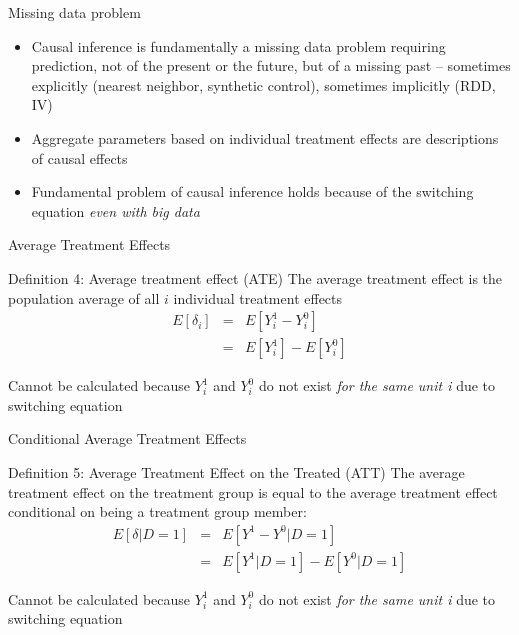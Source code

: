 \documentclass{beamer}
\begin{document}
\begin{frame}{Missing data problem}

  \begin{itemize}
    \item Causal inference is fundamentally a missing data problem requiring prediction, not of the present or the future, but of a missing past -- sometimes explicitly (nearest neighbor, synthetic control), sometimes implicitly (RDD, IV)
    \item Aggregate parameters based on individual treatment effects are descriptions of causal effects
    \item Fundamental problem of causal inference holds because of the switching equation \emph{even with big data}
  \end{itemize}

\end{frame}


\begin{frame}{Average Treatment Effects}

  \begin{block}{Definition 4: Average treatment effect (ATE)}
    The average treatment effect is the population average of all $i$ individual treatment effects
    \begin{eqnarray*}
      E[\delta_i]&=&E[Y_i^1-Y_i^0]\\
      &=&E[Y^1_i] - E[Y^0_i]
    \end{eqnarray*}
  \end{block}

  \bigskip

  Cannot be calculated because $Y^1_i$ and $Y^0_i$ do not exist \emph{for the same unit i} due to switching equation



\end{frame}



\begin{frame}{Conditional Average Treatment Effects}


  \begin{block}{Definition 5: Average Treatment Effect on the Treated (ATT)}
    The average treatment effect on the treatment group is equal to the average treatment effect conditional on being a treatment group member:
    \begin{eqnarray*}
      E[\delta|D=1]&=&E[Y^1-Y^0|D=1] \nonumber \\
      &=&E[Y^1|D=1]-E[Y^0|D=1]
    \end{eqnarray*}
  \end{block}
  Cannot be calculated because $Y^1_i$ and $Y^0_i$ do not exist \emph{for the same unit i} due to switching equation


\end{frame}
\end{document}
